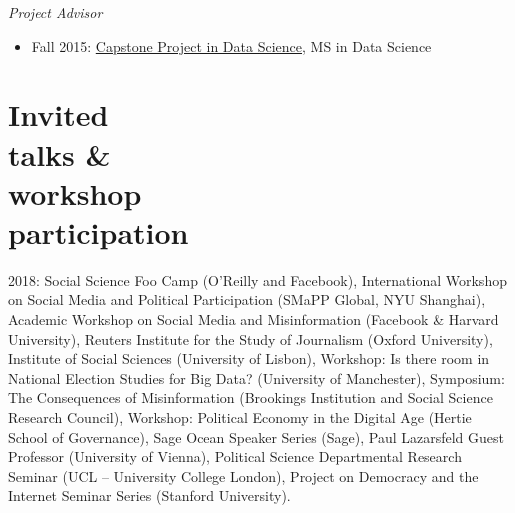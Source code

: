 \documentclass[margin,line,11pt]{resume}
\begin{document}
\begin{resume}
\emph{Project Advisor}
\begin{itemize}
\item Fall 2015: \href{http://cds.nyu.edu/academics/ms-in-data-science/curriculum/required-courses/#ds-ga-1006}{Capstone Project in Data Science}, MS in Data Science
\end{itemize}


    
    \newpage
    
        \section{\mysidestyle Invited\\talks \& \\workshop\\participation}
2018: Social Science Foo Camp (O'Reilly and Facebook), International Workshop on Social Media and Political Participation (SMaPP Global, NYU Shanghai), Academic Workshop on Social Media and Misinformation (Facebook \& Harvard University), Reuters Institute for the Study of Journalism (Oxford University), Institute of Social Sciences (University of Lisbon), Workshop: Is there room in National Election Studies for Big Data? (University of Manchester), Symposium: The Consequences of Misinformation (Brookings Institution and Social Science Research Council), Workshop: Political Economy in the Digital Age (Hertie School of Governance), Sage Ocean Speaker Series (Sage), Paul Lazarsfeld Guest Professor (University of Vienna), Political Science Departmental Research Seminar (UCL -- University College London), Project on Democracy and the Internet Seminar Series (Stanford University).
        

\end{resume}
\end{document}
